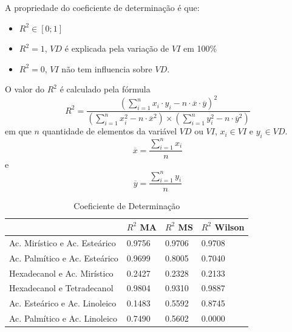 A propriedade do coeficiente de determinação é que:
\begin{itemize}
    \item $R^2\in [0;1]$
    \item $R^2=1$, $VD$ é explicada pela variação de $VI$ em 100\%
    \item $R^2=0$, $VI$ não tem influencia sobre $VD$.
\end{itemize}

O valor do $R^2$ é calculado pela fórmula
\begin{equation}
    R^2=\frac{\left(\displaystyle\sum_{i=1}^{n}x_i\cdot y_i-n\cdot\overline{x}\cdot\overline{y}\right)^2}{\left(\displaystyle\sum_{i=1}^{n}x_i^2-n\cdot\overline{x}^2\right)\times\left(\displaystyle\sum_{i=1}^{n}y_i^2-n\cdot\overline{y}^2\right)}
\end{equation}
em que $n$ quantidade de elementos da variável $VD$ ou $VI$, $x_i\in VI$ e $y_i\in VD$.
\begin{equation}
    \overline{x}=\frac{\displaystyle\sum_{i=1}^{n}x_i}{n}
\end{equation}
e
\begin{equation}
    \overline{y}=\frac{\displaystyle\sum_{i=1}^{n}y_i}{n}
\end{equation}

\begin{table}[H]
    \caption{Coeficiente de Determinação}
    \centering
    \begin{tabular}{l|p{3cm}p{3cm}p{3cm}}
    \hline
         & $R^2$ MA & $R^2$ MS & $R^2$ Wilson \\
    \hline
    Ac. Mirístico e Ac. Esteárico  & 0.9756  & 0.9706 & 0.9708 \\
    Ac. Palmítico e Ac. Esteárico  & 0.9699  & 0.8005 & 0.7040 \\
    Hexadecanol e Ac. Mirístico  & 0.2427  & 0.2328 & 0.2133 \\
    Hexadecanol e Tetradecanol  & 0.9804  & 0.9310 & 0.9887 \\
    Ac. Esteárico e Ac. Linoleico  & 0.1483  & 0.5592 & 0.8745 \\
    Ac. Palmítico e Ac. Linoleico  & 0.7490  & 0.5602 & 0.0000 \\
    \end{tabular}
    \label{tab:1}
\end{table}

